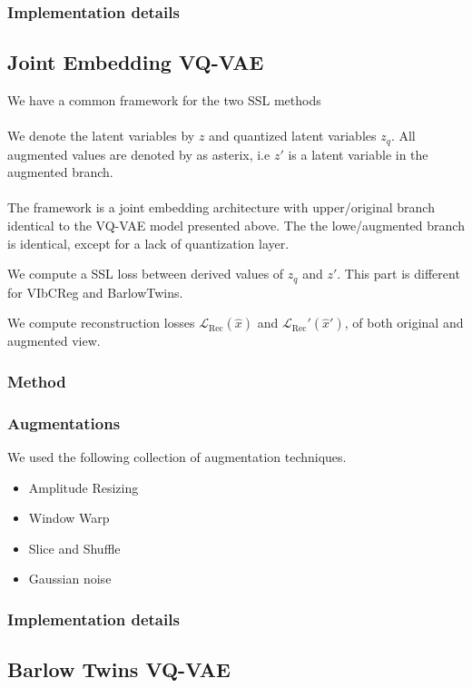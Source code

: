 \documentclass[../../thesis.tex]{subfiles}
\begin{document}
\subsubsection{Implementation details}


\subsection{Joint Embedding VQ-VAE}
We have a common framework for the two SSL methods\\\\
We denote the latent variables by $z$ and quantized latent variables $z_q$. All augmented values are denoted by as asterix, i.e $z'$ is a latent variable in the augmented branch. \\\\


The framework is a joint embedding architecture with upper/original branch identical to the VQ-VAE model presented above. The the lowe/augmented branch is identical, except for a lack of quantization layer. 

We compute a SSL loss between derived values of $z_q$ and $z'$. This part is different for VIbCReg and BarlowTwins.  

We compute reconstruction losses $\mathcal{L}_{\text{Rec}}(\hat{x})$ and $\mathcal{L}_{\text{Rec}}'(\hat{x}')$, of both original and augmented view. 
\subsubsection{Method}

\subsubsection{Augmentations}
We used the following collection of augmentation techniques.
\begin{itemize}
    \item Amplitude Resizing
    \item Window Warp
    \item Slice and Shuffle
    \item Gaussian noise
\end{itemize}

\subsubsection{Implementation details}

\subsection{Barlow Twins VQ-VAE}
\end{document}
